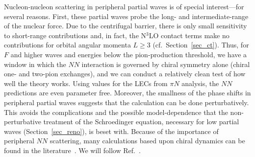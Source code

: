 \documentclass[sort&compress,preprint,3p]{elsarticle}
\begin{document}
Nucleon-nucleon scattering in peripheral partial waves
is of special interest---for several reasons.
First, these partial waves probe the long- and 
intermediate-range of the nuclear force. Due to the centrifugal
barrier, there is only small sensitivity to short-range
contributions and, in fact, the N$^3$LO contact terms
make no contributions for orbital angular momenta
$L\geq 3$ (cf.\ Section~\ref{sec_ct}).
Thus, for $F$ and higher waves and energies below the pion-production
threshold, we have a window in which the $NN$ interaction
is governed by chiral symmetry alone (chiral one-
and two-pion exchanges), and we can 
conduct a relatively clean test of how well 
the theory works.
Using values for the LECs from $\pi N$ analysis,
the $NN$ predictions are even parameter free.
Moreover, the smallness of the phase shifts in peripheral
partial waves suggests that the calculation can
be done perturbatively. This avoids the complications
and the possible model-dependence
that the non-perturbative treatment of the
Schroedinger equation, necessary for low partial
waves (Section~\ref{sec_reno}), is beset with.
Because of the importance of peripheral $NN$ scattering,
many calculations
based upon chiral dynamics can be found in the
literature~\cite{RR94,KBW97,KGW98,EM02,Ric99,BM04,Hig04}.
We will follow Ref.~\cite{EM02}.
\end{document}
